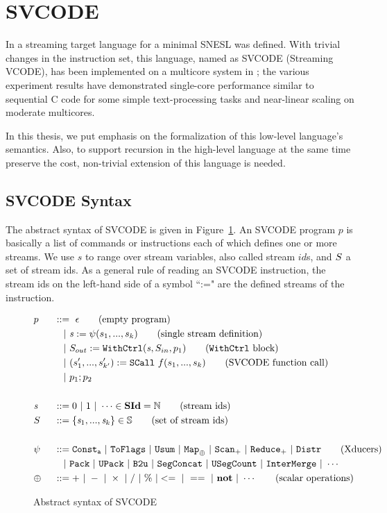 \section{SVCODE}
In \cite{Fmaster} a streaming target language for a minimal SNESL was defined.
With trivial changes in the instruction set, this language, named as SVCODE (Streaming VCODE), has been implemented on a multicore system in \cite{MF16}; the various experiment results
have demonstrated single-core performance similar to sequential C code for some simple 
text-processing tasks and near-linear scaling on moderate multicores.

In this thesis, we put emphasis on the formalization of this low-level language's semantics.
Also, to support recursion in the high-level language at the same time preserve the cost, non-trivial extension of this language is needed. 

\subsection{SVCODE Syntax}

The abstract syntax of SVCODE is given in Figure~\ref{fig-svcode1-gram}.
An SVCODE program $p$ is basically a list of commands or instructions each of which defines one or more streams. 
We use $s$ to range over stream variables, also called stream $id$s, and $\S$ a set of stream ids.
As a general rule of reading an SVCODE instruction, the stream ids on the left-hand side of a symbol ``:=" are the defined streams of the instruction.


\begin{figure}[h] \large
	\begin{alignat*}{2}
	&p  && :: = \ \epsilon \tag{empty program}\\ 
	&   && \quad | \ \sdef{\s}{\psi(s_1,...,s_k)}  \tag{single stream definition}\\
	&   && \quad | \ \withctrl{\s}{p_1}{\Sin}{\Sout}  \tag{\wc block}\\
	&   && \quad | \ \scall{f}{s_1,...,s_k}{(s_1',...,s_{k'}')} \tag{SVCODE function call}\\
	&   && \quad | \ p_1;p_2  \\
	\\
	&\s && ::= 0 \ | \ 1 \ | \ \cdots \in \SId  = \mathbb{N}   \tag{stream ids}\\
	&  \S && ::= \{\s_1,..., \s_k\} \in \sset  \tag{set of stream ids}\\
	\\
	& \psi \ && ::= \consta{a} \ | \ \toflag  
	\ | \ \usum \ | \ \map{\oplus} \ | \ \genscan_{+} \ | \ \genreduce_{+} \ | \ \distr  \tag{Xducers}  \\
    &   && \quad | \ \pack \ | \ \upack \ | \ \bu \ | \ \segconcat \ | \ \usegcount \ | \ \intermerge \ | \ \cdots  \\
    & \oplus  \ && :: = + \ | \ - \ | \ \times \ |  \  / \ | \ \% \ | <= \ | \ == \ | \  \*{not} \ | \ \cdots \tag{scalar operations}
	\end{alignat*}
	\caption{Abstract syntax of SVCODE \label{fig-svcode1-gram}}
\end{figure}


